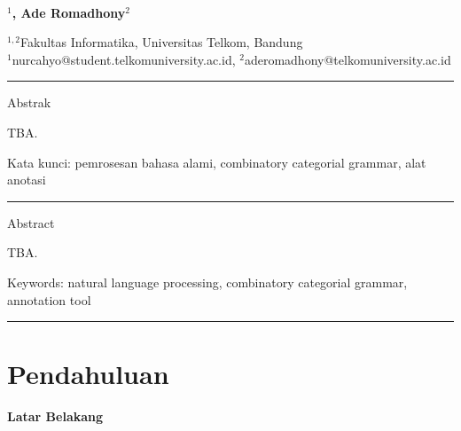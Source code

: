  
  \begin{center}
      \textbf{\large \Title}\\
      \bigskip 
  \end{center}
  
  
  
   \begin{center}
     \bf \Author$^1$, Ade Romadhony$^2$
  \end{center}
  
  
   \begin{center}
      $^{1,2}$Fakultas Informatika, Universitas Telkom, Bandung\\
      $^1$nurcahyo@student.telkomuniversity.ac.id, $^2$aderomadhony@telkomuniversity.ac.id
  \end{center}
  
   
   
{\bf \parindent0pt \noindent\rule{\textwidth}{1pt}
Abstrak

TBA.

\bigskip
Kata kunci: pemrosesan bahasa alami, combinatory categorial grammar, alat anotasi






\noindent\rule{\textwidth}{1pt}
Abstract

TBA.

\bigskip
Keywords: natural language processing, combinatory categorial grammar, annotation tool

\noindent\rule{\textwidth}{1pt} }
   



\section{Pendahuluan}

\noindent\textbf{Latar Belakang}

